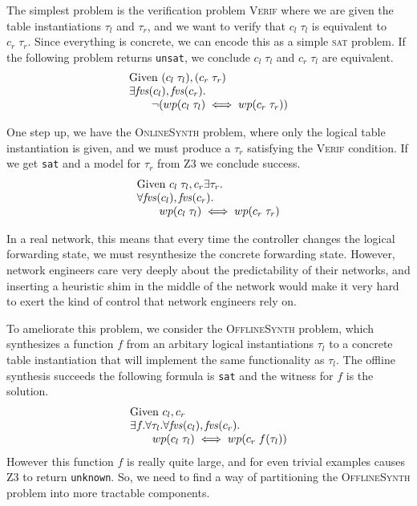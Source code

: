 The simplest problem is the verification problem \textsc{Verif} where we are
given the table instantiations $\tau_l$ and $\tau_r$, and we want to verify that
$c_l\; \tau_l$ is equivalent to $c_r\; \tau_r$. Since everything is concrete, we
can encode this as a simple \textsc{sat} problem. If the following problem
returns \texttt{unsat}, we conclude $c_l\; \tau_l$ and $c_r\; \tau_l$ are
equivalent.
\[\begin{array}{lcl}
    \text{Given }( c_l\; \tau_l), (c_r\; \tau_r) \\
    \exists \mathit{fvs}(c_l), \mathit{fvs}(c_r). \\
    \qquad \neg(wp(c_l\; \tau_l) \iff wp(c_r\; \tau_r))
  \end{array}
\]

One step up, we have the \textsc{OnlineSynth} problem, where only the logical
table instantiation is given, and we must produce a $\tau_r$ satisfying the
\textsc{Verif} condition. If we get \texttt{sat} and a model for $\tau_r$ from
Z3 we conclude success.
\[\begin{array}{lcl}
    \text{Given } c_l\; \tau_l,c_r
    \exists \tau_r.\\
    \forall \mathit{fvs}(c_l), \mathit{fvs}(c_r). \\
    \qquad wp(c_l\; \tau_l) \iff wp(c_r\; \tau_r)
  \end{array}
\]

In a real network, this means that every time the
controller changes the logical forwarding state, we must resynthesize the
concrete forwarding state. However, network engineers care very deeply about the
predictability of their networks, and inserting a heuristic shim in the middle
of the network would make it very hard to exert the kind of control that network
engineers rely on.

To ameliorate this problem, we consider the \textsc{OfflineSynth} problem, which
synthesizes a function $f$ from an arbitary logical instantiations $\tau_l$ to a
concrete table instantiation that will implement the same functionality as
$\tau_l$. The offline synthesis succeeds the following formula is \texttt{sat}
and the witness for $f$ is the solution.
\[\begin{array}{l}
    \text{Given } c_l,c_r\\
    \exists f. \forall \tau_l. \forall \mathit{fvs}(c_l), \mathit{fvs}(c_r). \\
    \qquad wp(c_l\; \tau_l) \iff wp(c_r\; f(\tau_l))
  \end{array}\]
However this function $f$ is really quite large, and for even trivial
examples causes Z3 to return \texttt{unknown}. So, we need to find a way of
partitioning the \textsc{OfflineSynth} problem into more tractable
components.

